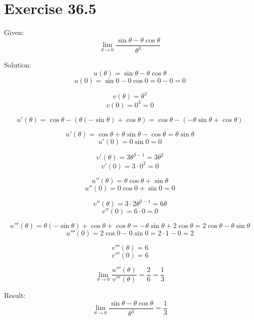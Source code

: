 \documentclass[a4paper, 10pt]{scrartcl}
\begin{document}
\section{Exercise 36.5}

Given:
\[\lim_{\theta \to 0}{\frac{\sin{\theta} - \theta\cos{\theta}}{\theta^{3}}}\]

Solution:
\[u(\theta) = \sin{\theta} - \theta\cos{\theta}\]
\[u(0) = \sin{0} - 0\cos{0} = 0 - 0 = 0\]

\[v(\theta) = \theta^{3}\]
\[v(0) = 0^{3} = 0\]

\[u'(\theta) = \cos{\theta} - (\theta(-\sin{\theta}) + \cos{\theta}) =
               \cos{\theta} - (-\theta\sin{\theta} + \cos{\theta})\]

\[u'(\theta) = \cos{\theta} + \theta\sin{\theta} - \cos{\theta} = \theta\sin{\theta}\]
\[u'(0) = 0\sin{0} = 0\]

\[v'(\theta) = 3\theta^{3 - 1} = 3\theta^{2}\]
\[v'(0) = 3\cdot 0^{2} = 0\]

\[u''(\theta) = \theta\cos{\theta} + \sin{\theta}\]
\[u''(0) = 0\cos{0} + \sin{0} = 0\]

\[v''(\theta) = 3\cdot 2\theta^{2 - 1} = 6\theta\]
\[v''(0) = 6\cdot 0 = 0\]

\[u'''(\theta) = \theta(-\sin{\theta}) + \cos{\theta} + \cos{\theta} =
                 -\theta\sin{\theta} + 2\cos{\theta} = 2\cos{\theta} - \theta\sin{\theta}\]
\[u'''(0) = 2\cos{0} - 0\sin{0} = 2\cdot 1 - 0 = 2\]

\[v'''(\theta) = 6\]
\[v'''(0) = 6\]

\[\lim_{\theta \to 0}{\frac{u'''(\theta)}{v'''(\theta)}} = \frac{2}{6} = \frac{1}{3}\]

Result:
\[\lim_{\theta \to 0}{\frac{\sin{\theta} - \theta\cos{\theta}}{\theta^{3}}} = \frac{1}{3}\]
\end{document}
